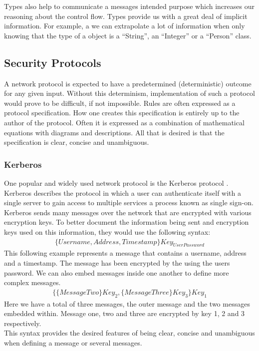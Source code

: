 Types also help to communicate a messages intended purpose which increases our reasoning about the control flow. Types provide us with a great deal of implicit information. For example, a we can extrapolate a lot of information when only knowing that the type of a object is a ``String'', an ``Integer'' or a ``Person'' class.



\subsection{Security Protocols}
A network protocol is expected to have a predetermined (deterministic) outcome for any given input. Without this determinism, implementation of such a protocol would prove to be difficult, if not impossible. Rules are often expressed as a protocol specification. How one creates this specification is entirely up to the author of the protocol. Often it is expressed as a combination of mathematical equations with diagrams and descriptions.  All that is desired is that the specification is clear, concise and unambiguous.
\subsubsection{Kerberos}
One popular and widely used network protocol is the Kerberos protocol \cite{steiner1988kerberos}. Kerberos describes the protocol in which a user can authenticate itself with a single server to gain access to multiple services a process known as single sign-on. Kerberos sends many messages over the network that are encrypted with various encryption keys. To better document the information being sent and encryption keys used on this information, they would use the following syntax:
$$
\begin{multlined}
 \{Username, Address, Timestamp\}Key_{UserPassword}
\end{multlined}
$$
This following example represents a message that contains a username, address and a timestamp. The message has been encrypted by the using the users password. We can also embed messages inside one another to define more complex messages.
$$
\begin{multlined}
 \{\{MessageTwo\}Key_{2}, \{MessageThree\}Key_{3}\}Key_1
\end{multlined}
$$
Here we have a total of three messages, the outer message and the two messages embedded within. Message one, two and three are encrypted by key 1, 2 and 3 respectively.
\\
This syntax provides the desired features of being clear, concise and unambiguous when defining  a message or several messages.

